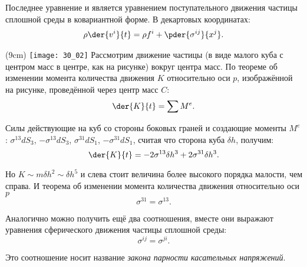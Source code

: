 Последнее уравнение и является уравнением поступательного движения частицы
сплошной среды в ковариантной форме. В декартовых координатах:
\begin{gather*}
    \rho  \der{v^i}{t}  = \rho f^i + \pder{ \sigma^{ij}}{x^j}.
\end{gather*}

\sidefig(9cm)
{\texttt{[image: 30\_02]}}{  
Рассмотрим движение частицы (в виде малого куба с центром масс в центре, как на
рисунке) вокруг центра масс. По теореме об изменении момента количества
движения \( K \) относительно оси \( p \), изображённой на рисунке, проведённой
через центр масс \( C \):
\[
    \der{K}{t} = \sum M^e.
\]
}

Силы действующие на куб со стороны боковых граней и создающие моменты \( M^e \):
\( \sigma^{13}dS_3 \), \( -\sigma^{13}dS_3 \), \( \sigma^{31}dS_1 \),
\( -\sigma^{31}dS_1 \), считая что сторона куба \( \delta h \), получим:
\[
    \der{K}{t} = -2\sigma^{13}\delta h^3+ 2\sigma^{31}\delta h^3.
\]

Но \(K \sim m \delta h^2 \sim \delta h^5\) и слева стоит величина более
высокого порядка малости, чем справа. И теорема об изменении момента количества
движения относительно оси \(p\)
\[
    \sigma^{31} = \sigma^{13}.
\]

Аналогично можно получить ещё два соотношения, вместе они выражают уравнения
сферического движения частицы сплошной среды:
\[
    \sigma^{ij} = \sigma^{ji}.
\]

Это соотношение носит название \emph{закона парности касательных напряжений}. 

\newpage
